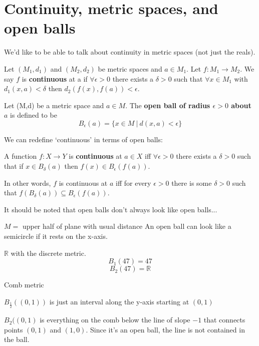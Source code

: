 \section{Continuity, metric spaces, and open balls}
We'd like to be able to talk about continuity in metric spaces (not just the reals).

\begin{definition}
Let $(M_1, d_1)$ and $(M_2, d_2)$ be metric spaces and $a \in M_1$. Let $f:M_1 \rightarrow M_2$. We say $f$ is {\bf continuous} at a if $\forall \epsilon > 0$ there exists a
$\delta > 0$ such that $\forall x\in M_1$ with $d_1 (x,a) <\delta$ then $d_2 (f(x), f(a))<\epsilon$.
\end{definition}

\placeholder

\begin{definition}
Let (M,d) be a metric space and $a\in M$. The {\bf open ball of radius $\epsilon >0$ about $a$} is defined to be 
\[B_\epsilon (a) = \{x\in M\ |\ d(x,a)<\epsilon \}\]
\end{definition}

We can redefine `continuous' in terms of open balls:
\begin{definition}
A function $f:X\to Y$ is {\bf continuous} at $a\in X$ iff $\forall\epsilon > 0$ there exists a $\delta >0$ such that if $x\in B_\delta (a)$ then $f(x) \in B_\epsilon (f(a))$.

In other words, $f$ is continuous at $a$ iff for every $\epsilon > 0$ there is some $\delta > 0$ such that $f(B_\delta (a)) \subseteq B_\epsilon (f(a))$.
\end{definition}


It should be noted that open balls don't always look like open balls...

\begin{example}
$M =$ upper half of plane with usual distance
\placeholder An open ball can look like a semicircle if it rests on the x-axis.
\end{example}

\begin{example}
$\mathbb{R}$ with the discrete metric.
$$B_1 (47) = {47}$$
$$B_2 (47) = \mathbb{R}$$
\end{example}


\begin{example}

Comb metric

$B_{\frac{1}{2}} ((0,1))$ is just an interval along the y-axis starting at $(0,1)$

$B_2 ((0,1)$ is everything on the comb below the line of slope $-1$ that connects points $(0,1)$ and $(1,0)$. Since it's an open ball, the line is not contained in the ball.
\placeholder
\end{example}

